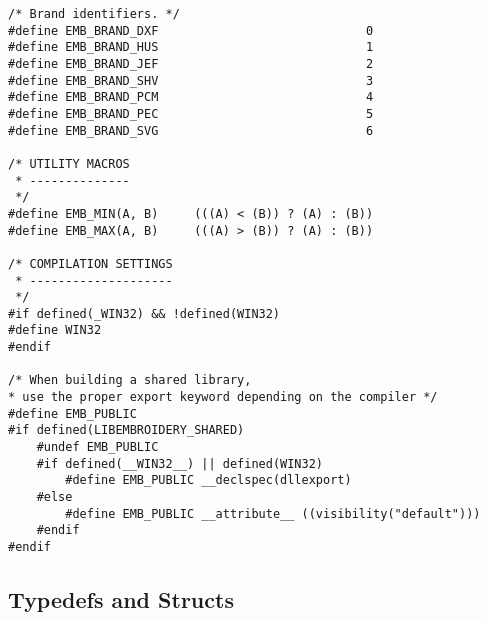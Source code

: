 \begin{verbatim}
/* Brand identifiers. */
#define EMB_BRAND_DXF                             0
#define EMB_BRAND_HUS                             1
#define EMB_BRAND_JEF                             2
#define EMB_BRAND_SHV                             3
#define EMB_BRAND_PCM                             4
#define EMB_BRAND_PEC                             5
#define EMB_BRAND_SVG                             6

/* UTILITY MACROS
 * --------------
 */
#define EMB_MIN(A, B)     (((A) < (B)) ? (A) : (B))
#define EMB_MAX(A, B)     (((A) > (B)) ? (A) : (B))

/* COMPILATION SETTINGS
 * --------------------
 */
#if defined(_WIN32) && !defined(WIN32)
#define WIN32
#endif

/* When building a shared library,
* use the proper export keyword depending on the compiler */
#define EMB_PUBLIC
#if defined(LIBEMBROIDERY_SHARED)
    #undef EMB_PUBLIC
    #if defined(__WIN32__) || defined(WIN32)
        #define EMB_PUBLIC __declspec(dllexport)
    #else
        #define EMB_PUBLIC __attribute__ ((visibility("default")))
    #endif
#endif
\end{verbatim}

\subsection{Typedefs and Structs}

